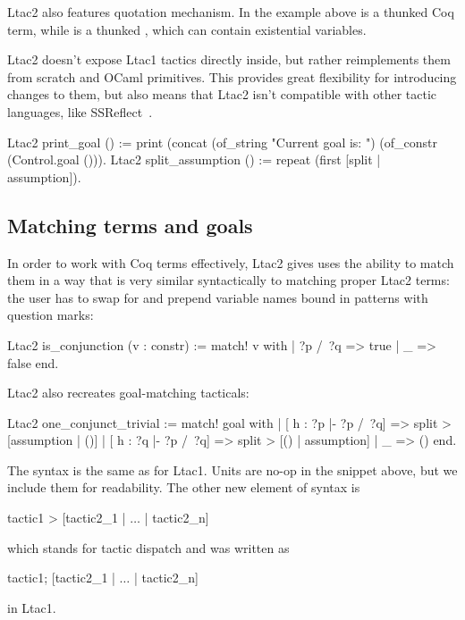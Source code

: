 Ltac2 also features quotation mechanism.
In the example above  is a thunked Coq term, while  is a thunked , which can contain existential variables.

Ltac2 doesn't expose Ltac1 tactics directly inside, but rather reimplements them from scratch and OCaml primitives.
This provides great flexibility for introducing changes to them, but also means that Ltac2 isn't compatible with other tactic languages, like SSReflect~\cite[Section~3.1.3]{thecoqdevelopmentteamCoqProofAssistant2020}.

\begin{coq}
Ltac2 print_goal () := print (concat (of_string "Current goal is: ")
                                     (of_constr (Control.goal ())).
Ltac2 split_assumption () := repeat (first [split | assumption]).
\end{coq}

\subsection{Matching terms and goals}
\label{sec:matching-terms}

In order to work with Coq terms effectively, Ltac2 gives uses the ability to match them in a way that is very similar syntactically to matching proper Ltac2 terms: the user has to swap  for  and prepend variable names bound in patterns with question marks:
\begin{coq}
Ltac2 is_conjunction (v : constr) := match! v with
  | ?p /\ ?q => true
  | _ => false
  end.
\end{coq}

Ltac2 also recreates goal-matching tacticals:
\begin{coq}
Ltac2 one_conjunct_trivial :=
  match! goal with
  | [ h : ?p |- ?p /\ ?q] => split > [assumption | ()]
  | [ h : ?q |- ?p /\ ?q] => split > [() | assumption]
  | _ => ()
  end.
\end{coq}

The syntax is the same as for Ltac1.
Units \coqe{()} are no-op in the snippet above, but we include them for readability.
The other new element of syntax is
\begin{coq}
tactic1 > [tactic2_1 | $\ldots$ | tactic2_n]
\end{coq}
which stands for tactic dispatch and was written as
\begin{coq}
tactic1; [tactic2_1 |  $\ldots$ | tactic2_n]
\end{coq}
in Ltac1.

